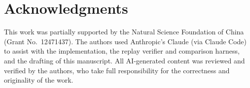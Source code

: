 \section*{Acknowledgments}
This work was partially supported by the Natural Science Foundation of
China (Grant No.\ 12471437). The authors used Anthropic's Claude (via
Claude Code) to assist with the \PORTER{} implementation, the replay
verifier and comparison harness, and the drafting of this manuscript. All
AI-generated content was reviewed and verified by the authors, who take
full responsibility for the correctness and originality of the work.

